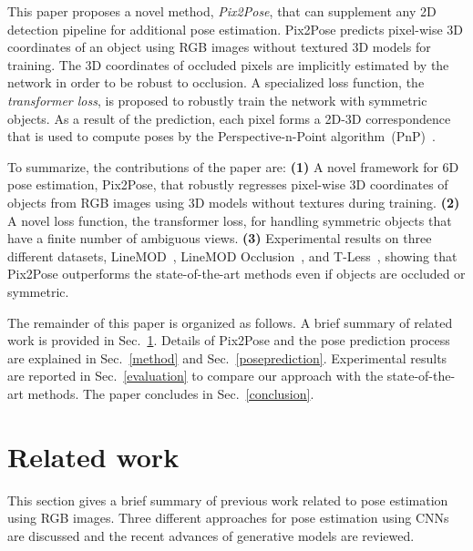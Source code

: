 \documentclass[10pt,twocolumn,letterpaper]{article}
\begin{document}
This paper proposes a novel method, \textit{Pix2Pose}, that can supplement any 2D detection pipeline for additional pose estimation. Pix2Pose predicts pixel-wise 3D coordinates of an object using RGB images without textured 3D models for training. The 3D coordinates of occluded pixels are implicitly estimated by the network in order to be robust to occlusion. A specialized loss function, the \textit{transformer loss}, is proposed to robustly train the network with symmetric objects. As a result of the prediction, each pixel forms a 2D-3D correspondence that is used to compute poses by the Perspective-n-Point algorithm~(PnP)~\cite{Lepetit2008epnp}. 

 
 To summarize, the contributions of the paper are: 
\textbf{(1)} A novel framework for 6D pose estimation, Pix2Pose, that robustly regresses pixel-wise 3D coordinates of objects from RGB images using 3D models without textures during training. \textbf{(2)} A novel loss function, the transformer loss, for handling symmetric objects that have a finite number of ambiguous views. \textbf{(3)} Experimental results on three different datasets, LineMOD~\cite{linemode_hinterstoisser2012}, LineMOD Occlusion~\cite{brachmann2014learning_occlusion}, and T-Less~\cite{rgbddataset:tless}, showing that Pix2Pose outperforms the state-of-the-art methods even if objects are occluded or symmetric.

The remainder of this paper is organized as follows. A brief summary of related work is provided in Sec.~\ref{relatedworks}. Details of Pix2Pose and the pose prediction process are explained in Sec.~\ref{method} and Sec.~\ref{poseprediction}. Experimental results are reported in Sec.~\ref{evaluation} to compare our approach with the state-of-the-art methods. The paper concludes in Sec.~\ref{conclusion}.

\section{Related work} \label{relatedworks}
This section gives a brief summary of previous work related to pose estimation using RGB images. Three different approaches for pose estimation using CNNs are discussed and the recent advances of generative models are reviewed. 
\end{document}
